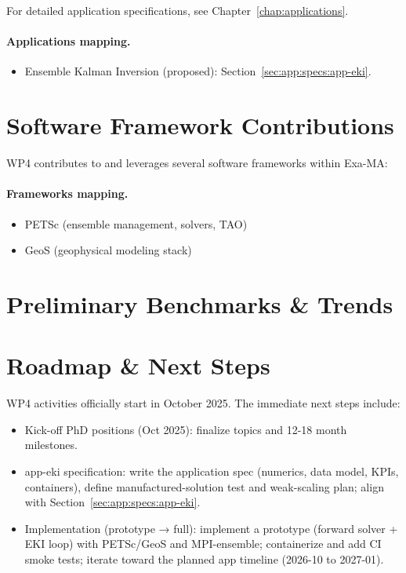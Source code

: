For detailed application specifications, see Chapter~\ref{chap:applications}.

\paragraph{Applications mapping.}
\begin{itemize}
	\item Ensemble Kalman Inversion (proposed): Section~\ref{sec:app:specs:app-eki}.
\end{itemize}

\section{Software Framework Contributions}
\label{sec:wp4:software}
WP4 contributes to and leverages several software frameworks within Exa-MA:

\paragraph{Frameworks mapping.}
\begin{itemize}
	\item PETSc (ensemble management, solvers, TAO)
	\item GeoS (geophysical modeling stack)
\end{itemize}

\section{Preliminary Benchmarks \& Trends}
\label{sec:wp4:benchmarks}

\section{Roadmap \& Next Steps}
\label{sec:wp4:roadmap}

WP4 activities officially start in October 2025. The immediate next steps include:
\begin{itemize}
	\item Kick-off PhD positions (Oct 2025): finalize topics and 12-18 month milestones.
	\item app-eki specification: write the application spec (numerics, data model, KPIs, containers), define manufactured-solution test and weak-scaling plan; align with Section~\ref{sec:app:specs:app-eki}.
	\item Implementation (prototype → full): implement a prototype (forward solver + EKI loop) with PETSc/GeoS and MPI-ensemble; containerize and add CI smoke tests; iterate toward the planned app timeline (2026-10 to 2027-01).
\end{itemize}
